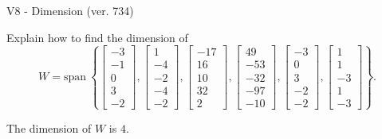 \begin{exercise}
  \begin{exerciseTitle}V8 - Dimension (ver. 734)\end{exerciseTitle}
  \begin{exerciseStatement}
    Explain how to find the dimension of 
\[W=\mathrm{span}\ \left\{\left[\begin{array}{r}
-3 \\
-1 \\
0 \\
3 \\
-2
\end{array}\right] , \left[\begin{array}{r}
1 \\
-4 \\
-2 \\
-4 \\
-2
\end{array}\right] , \left[\begin{array}{r}
-17 \\
16 \\
10 \\
32 \\
2
\end{array}\right] , \left[\begin{array}{r}
49 \\
-53 \\
-32 \\
-97 \\
-10
\end{array}\right] , \left[\begin{array}{r}
-3 \\
0 \\
3 \\
-2 \\
-2
\end{array}\right] , \left[\begin{array}{r}
1 \\
1 \\
-3 \\
1 \\
-3
\end{array}\right]\right\}.\]



  \end{exerciseStatement}
  \begin{exerciseAnswer}
   The dimension of \(W\) is  \(4\).
  


  \end{exerciseAnswer}
\end{exercise}